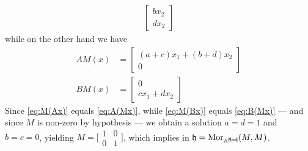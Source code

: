 \begin{example}
\begin{align}
\begin{bmatrix}
            b x_2 \\
            d x_2
        \end{bmatrix}
    \end{align}
    while on the other hand we have
    \begin{align}
        \label{eq:A(Mx)}
        A M(x) & =
        \begin{bmatrix}
            (a + c) x_1 + (b + d) x_2 \\
            0
        \end{bmatrix}
        \\ %
        \label{eq:B(Mx)}
        B M(x) & =
        \begin{bmatrix}
            0 \\
            c x_1 + d x_2
        \end{bmatrix}
    \end{align}
    Since \cref{eq:M(Ax)} equals \cref{eq:A(Mx)}, while \cref{eq:M(Bx)} equals
    \cref{eq:B(Mx)} --- and since \(M\) is non-zero by hypothesis --- we obtain a
    solution \(a = d = 1\) and \(b = c = 0\), yielding
    \(M = \big[
        \begin{smallmatrix}
            1 & 0 \\
            0 & 1
        \end{smallmatrix}
        \big]\), which implies in \(\mathfrak{h} = \operatorname{Mor}_{{{}_{R}\texttt{Mod}}}(M, M)\).
\end{example}

